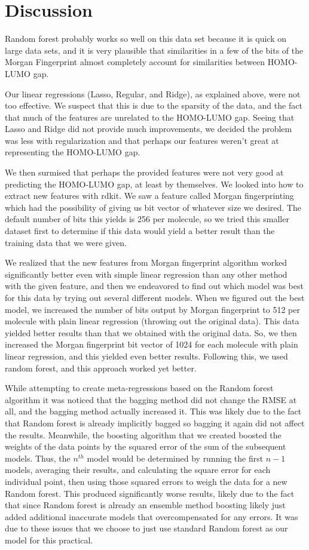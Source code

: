 \documentclass[11pt]{article}
\begin{document}
\section{Discussion}
Random forest probably works so well on this data set because it is quick on large data sets, and it is very plausible that similarities in a few of the bits of the Morgan Fingerprint almost completely account for similarities between HOMO-LUMO gap.

Our linear regressions (Lasso, Regular, and Ridge), as explained above, were not too effective. We suspect that this is due to the sparsity of the data, and the fact that much of the features are unrelated to the HOMO-LUMO gap. Seeing that Lasso and Ridge did not provide much improvements, we decided the problem was less with regularization and that perhaps our features weren't great at representing the HOMO-LUMO gap.

We then surmised that perhaps the provided features were not very good at predicting the HOMO-LUMO gap, at least by themselves. We looked into how to extract new features with rdkit. We saw a feature called Morgan fingerprinting which had the possibility of giving us bit vector of whatever size we desired. The default number of bits this yields is 256 per molecule, so we tried this smaller dataset first to determine if this data would yield a better result than the training data that we were given. 

We realized that the new features from Morgan fingerprint algorithm worked significantly better even with simple linear regression than any other method with the given feature, and then we endeavored to find out which model was best for this data by trying out several different models. When we figured out the best model, we increased the number of bits output by Morgan fingerprint to 512 per molecule with plain linear regression (throwing out the original data). This data yielded better results than that we obtained with the original data. So, we then increased the Morgan fingerprint bit vector of 1024 for each molecule with plain linear regression, and this yielded even better results. Following this, we used random forest, and this approach worked yet better.

While attempting to create meta-regressions based on the Random forest algorithm it was noticed that the bagging method did not change the RMSE at all, and the bagging method actually increased it. This was likely due to the fact that Random forest is already implicitly bagged so bagging it again did not affect the results. Meanwhile, the boosting algorithm that we created boosted the weights of the data points by the squared error of the sum of the subsequent models. Thus, the $n^{th}$ model would be determined by running the first $n-1$ models, averaging their results, and calculating the square error for each individual point, then using those squared errors to weigh the data for a new Random forest. This produced significantly worse results, likely due to the fact that since Random forest is already an ensemble method boosting likely just added additional inaccurate models that overcompensated for any errors. It was due to these issues that we choose to just use standard Random forest as our model for this practical.
\end{document}
